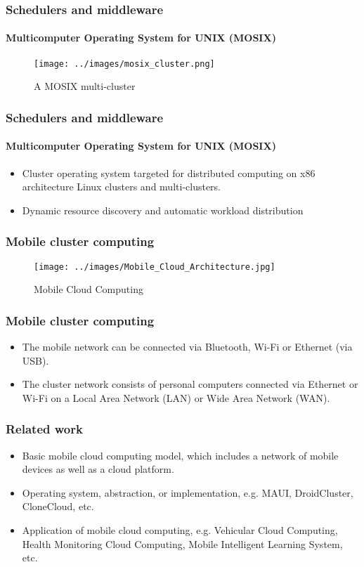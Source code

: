 \documentclass[11pt]{beamer}
\begin{document}
\begin{frame}
\frametitle{Schedulers and middleware}
\framesubtitle{Multicomputer Operating System for UNIX (MOSIX)}
\begin{figure}[h]
	\centering
	\texttt{[image: ../images/mosix\_cluster.png]}
	\caption{A MOSIX multi-cluster}
	\label{mosix_multicluster}
\end{figure}
\end{frame}

\begin{frame}
\frametitle{Schedulers and middleware}
\framesubtitle{Multicomputer Operating System for UNIX (MOSIX)}
\begin{itemize}
	\item Cluster operating system targeted for distributed computing on x86 architecture Linux clusters and multi-clusters.
	\item Dynamic resource discovery and automatic workload distribution
\end{itemize}
\end{frame}

\begin{frame}
\frametitle{Mobile cluster computing}
\begin{figure}[h]
	\centering
	\texttt{[image: ../images/Mobile\_Cloud\_Architecture.jpg]}
	\caption{Mobile Cloud Computing}
	\label{mcc1}
\end{figure}
\end{frame}


\begin{frame}
\frametitle{Mobile cluster computing}
\begin{itemize}
	\item The mobile network can be connected via Bluetooth, Wi-Fi or Ethernet (via USB).
	\item The cluster network consists of personal computers connected via Ethernet or Wi-Fi on a Local Area Network (LAN) or Wide Area Network (WAN).
\end{itemize}
\end{frame}


\begin{frame}
\frametitle{Related work}
\begin{itemize}
	\item Basic mobile cloud computing model, which includes a network of mobile devices as well as a cloud platform.
	\item Operating system, abstraction, or implementation, e.g. MAUI, DroidCluster, CloneCloud, etc.
	\item Application of mobile cloud computing, e.g. Vehicular Cloud Computing, Health Monitoring Cloud Computing, Mobile Intelligent Learning System, etc.
\end{itemize}
\end{frame}
\end{document}
